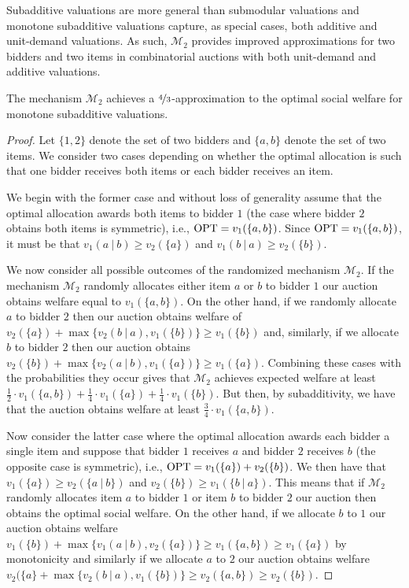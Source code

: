 Subadditive valuations are more general than submodular valuations and monotone subadditive valuations capture, as special cases, both additive and unit-demand valuations.  As such, $\mathcal{M}_2$ provides improved approximations for two bidders and two items in combinatorial auctions with both unit-demand and additive valuations.
\begin{claim}
The mechanism $\mathcal{M}_2$ achieves a $\nicefrac 4 3$-approximation to the optimal social welfare for monotone subadditive valuations.
\end{claim}
\begin{proof}
    Let $\{1,2\}$ denote the set of two bidders and $\{a,b\}$ denote the set of two items.  
    We consider two cases depending on whether the optimal allocation is such that one bidder receives both items or  each bidder receives an item.

    We begin with the former case and without loss of generality assume that the optimal allocation awards both items to bidder $1$ (the case where bidder $2$ obtains both items is symmetric), i.e., $\text{OPT} = v_1(\{a,b\})$.   Since $\text{OPT} = v_1(\{a,b\})$, it must be that $v_1(a~|~b) \geq v_2(\{a\})$ and $v_1(b~|~a) \geq v_2(\{b\})$. 
    
    We now consider all possible outcomes of the randomized mechanism $\mathcal M_2$. If the mechanism $\mathcal M_2$ randomly allocates either item $a$ or $b$ to bidder $1$ our auction obtains welfare equal to $v_1(\{a,b\})$.  On the other hand, if we randomly allocate $a$ to bidder $2$ then our auction obtains welfare of $v_2(\{a\}) + \max\{v_2(b~|~a),v_1(\{b\})\} \geq v_1(\{b\})$ and, similarly, if we allocate $b$ to bidder $2$ then our auction obtains $v_2(\{b\}) + \max\{v_2(a~|~b),v_1(\{a\})\} \geq v_1(\{a\})$.  Combining these cases with the probabilities they occur gives that $\mathcal M_2$ achieves expected welfare at least $\frac{1}{2}\cdot v_1(\{a,b\}) + \frac{1}{4}\cdot v_1(\{a\}) + \frac{1}{4}\cdot v_1(\{b\})$.  But then, by subadditivity, we have that the auction obtains welfare at least $\frac{3}{4}\cdot v_1(\{a,b\})$.

    Now consider the latter case where the optimal allocation awards each bidder a single item and suppose that bidder $1$ receives $a$ and bidder $2$ receives $b$ (the opposite case is symmetric), i.e., $\text{OPT} = v_1(\{a\}) + v_2(\{b\})$.  We then have that $v_1(\{a\}) \geq v_2(\{a~|~b\})$ and $v_2(\{b\}) \geq v_1(\{b ~|~ a\})$.  This means that if $\mathcal M_2$  randomly allocates item $a$ to bidder $1$ or item $b$ to bidder $2$ our auction then obtains the optimal social welfare.  On the other hand, if we allocate $b$ to $1$ our auction obtains welfare $v_1(\{b\}) + \max\{v_1(a~|~b) ,v_2(\{a\})\} \geq v_1(\{a,b\}) \geq v_1(\{a\})$ by monotonicity and similarly if we allocate $a$ to $2$ our auction obtains welfare $v_2(\{a\} + \max\{v_2(b~|~a) ,v_1(\{b\})\} \geq v_2(\{a,b\}) \geq v_2(\{b\})$.  
    

\end{proof}
